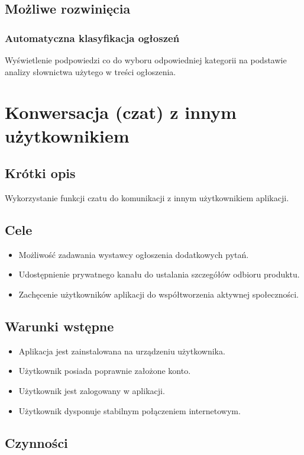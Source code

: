 \documentclass[licencjacka]{pracamgr}
\begin{document}
    \subsection{Możliwe rozwinięcia}
    \subsubsection{Automatyczna klasyfikacja ogłoszeń}
    Wyświetlenie podpowiedzi co do wyboru odpowiedniej kategorii na podstawie analizy słownictwa użytego w treści ogłoszenia.

\section{Konwersacja (czat) z innym użytkownikiem}
    \subsection{Krótki opis}
    Wykorzystanie funkcji czatu do komunikacji z innym użytkownikiem aplikacji.
    \subsection{Cele}
    \begin{itemize}
        \item Możliwość zadawania wystawcy ogłoszenia dodatkowych pytań.
        \item Udostępnienie prywatnego kanału do ustalania szczegółów odbioru produktu.
        \item Zachęcenie użytkowników aplikacji do współtworzenia aktywnej społeczności.
    \end{itemize}
    \subsection{Warunki wstępne}
    \begin{itemize}
        \item Aplikacja jest zainstalowana na urządzeniu użytkownika.
        \item Użytkownik posiada poprawnie założone konto.
        \item Użytkownik jest zalogowany w aplikacji.
        \item Użytkownik dysponuje stabilnym połączeniem internetowym.
    \end{itemize}
    \subsection{Czynności}
\end{document}
